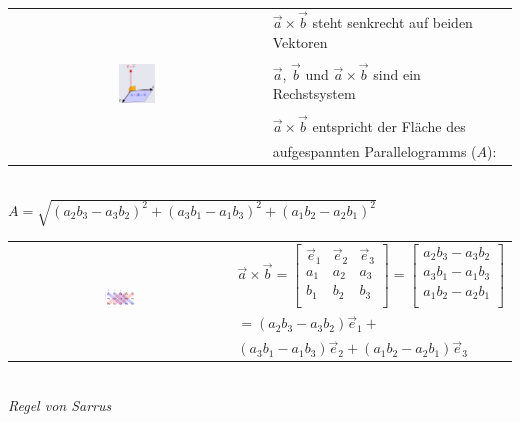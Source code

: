 \begin{tabular}{cl}
    \multirow{7}{*}{
        \includegraphics[width=0.15\textwidth]{assets/vectorproduct.png}
    }
    & $\vec{a} \times \vec{b}$ steht senkrecht auf beiden Vektoren \\
    & \\
    & $\vec{a}$, $\vec{b}$ und $\vec{a} \times \vec{b}$ sind ein Rechstsystem \\
    & \\
    & $\vec{a} \times \vec{b}$ entspricht der Fläche des \\
    & aufgespannten Parallelogramms ($A$): \\
\end{tabular} \\

$A = \sqrt{(a_2 b_3 - a_3 b_2)^2 + (a_3 b_1 - a_1 b_3)^2 + (a_1 b_2 - a_2 b_1)^2}$ \\

\begin{tabular}{cl}
    \multirow{4}{*}{
        \includegraphics[width=0.15\textwidth]{assets/vectorproduct-build.png}
    }
    & $\vec{a} \times \vec{b} = \begin{bmatrix}
            \vec{e}_1 & \vec{e}_2 & \vec{e}_3 \\
            a_1 & a_2 & a_3 \\
            b_1 & b_2 & b_3 \\
        \end{bmatrix} = \begin{bmatrix}
            a_2 b_3 - a_3 b_2 \\
            a_3 b_1 - a_1 b_3 \\
            a_1 b_2 - a_2 b_1 \\
        \end{bmatrix}$ \\
    & $= (a_2 b_3 - a_3 b_2) \vec{e}_1 +$ \\
    & $(a_3 b_1 - a_1 b_3) \vec{e}_2 + (a_1 b_2 - a_2 b_1) \vec{e}_3 $ \\
\end{tabular} \\
\textit{Regel von Sarrus} \\


